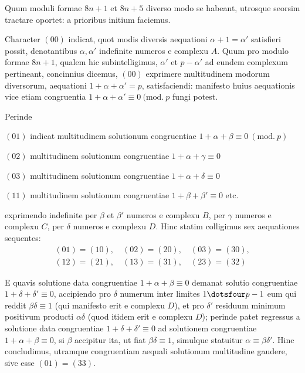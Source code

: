 Quum moduli formae $8n+1$ et $8n+5$ diverso modo se habeant, utrosque seorsim tractare oportet: a prioribus initium faciemus.

Character $(00)$ indicat, quot modis diversis aequationi $\alpha+1=\alpha'$ satisfieri possit, denotantibus $\alpha,\alpha'$ indefinite numeros e complexu $A$. Quum pro modulo formae $8n+1$, qualem hic subintelligimus, $\alpha'$ et $p-\alpha'$ ad eundem complexum pertineant, concinnius dicemus, $(00)$ exprimere multitudinem modorum diversorum, aequationi $1+\alpha+\alpha'=p$, satisfaciendi: manifesto huius aequationis vice etiam congruentia $1+\alpha+\alpha'\equiv0\ (\mathrm{mod.}\ p$ fungi potest.

Perinde
\begin{center}
\begin{minipage}{\linewidth}
$(01)$ indicat multitudinem solutionum congruentiae $1+\alpha+\beta\equiv0\ (\mathrm{mod.}\ p)$\par
$(02)$ multitudinem solutionum congruentiae $1+\alpha+\gamma\equiv0$\par
$(03)$ multitudinem solutionum congruentiae $1+\alpha+\delta\equiv0$\par
$(11)$ multitudinem solutionum congruentiae $1+\beta+\beta'\equiv0$ etc.
\end{minipage}
\end{center}
exprimendo indefinite per $\beta$ et $\beta'$ numeros e complexu $B$, per $\gamma$ numeros e complexu $C$, per $\delta$ numeros e complexu $D$. Hinc statim colligimus sex aequationes sequentes:
\[
\begin{gathered}
(01)=(10),\quad(02)=(20),\quad(03)=(30),\\
(12)=(21),\quad(13)=(31),\quad(23)=(32)
\end{gathered}
\]

E quavis solutione data congruentiae $1+\alpha+\beta\equiv0$ demanat solutio congruentiae $1+\delta+\delta'\equiv0$, accipiendo pro $\delta$ numerum inter limites $1\dotsfour p-1$
%
eum qui reddit $\beta\delta\equiv1$ (qui manifesto erit e complexu $D$), et pro $\delta'$ residuum minimum positivum producti $\alpha\delta$ (quod itidem erit e complexu $D$); perinde patet regressus a solutione data congruentiae $1+\delta+\delta'\equiv0$ ad solutionem congruentiae $1+\alpha+\beta\equiv0$, si $\beta$ accipitur ita, ut fiat $\beta\delta\equiv1$, simulque statuitur $\alpha\equiv\beta\delta'$. Hinc concludimus, utramque congruentiam aequali solutionum multitudine gaudere, sive esse $(01)=(33)$.


